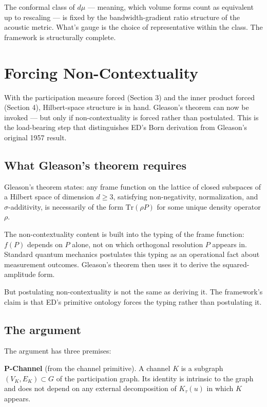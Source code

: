 \documentclass[11pt,a4paper]{article}
\begin{document}
The conformal class of $d\mu$ --- meaning, which volume forms count as equivalent up to rescaling --- is fixed by the bandwidth-gradient ratio structure of the acoustic metric. What's gauge is the choice of representative within the class. The framework is structurally complete.

\section{Forcing Non-Contextuality}

With the participation measure forced (Section 3) and the inner product forced (Section 4), Hilbert-space structure is in hand. Gleason's theorem can now be invoked --- but only if non-contextuality is forced rather than postulated. This is the load-bearing step that distinguishes ED's Born derivation from Gleason's original 1957 result.

\subsection{What Gleason's theorem requires}

Gleason's theorem states: any frame function on the lattice of closed subspaces of a Hilbert space of dimension $d \geq 3$, satisfying non-negativity, normalization, and $\sigma$-additivity, is necessarily of the form $\mathrm{Tr}(\rho P)$ for some unique density operator $\rho$.

The non-contextuality content is built into the typing of the frame function: $f(P)$ depends on $P$ alone, not on which orthogonal resolution $P$ appears in. Standard quantum mechanics postulates this typing as an operational fact about measurement outcomes. Gleason's theorem then uses it to derive the squared-amplitude form.

But postulating non-contextuality is not the same as deriving it. The framework's claim is that ED's primitive ontology forces the typing rather than postulating it.

\subsection{The argument}

The argument has three premises:

\textbf{P-Channel} (from the channel primitive). A channel $K$ is a subgraph $(V_K, E_K) \subset G$ of the participation graph. Its identity is intrinsic to the graph and does not depend on any external decomposition of $K_\tau(u)$ in which $K$ appears.
\end{document}
